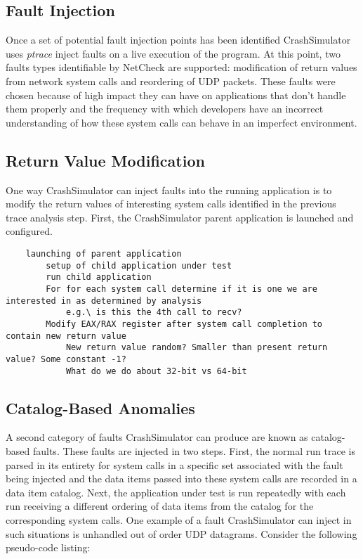     \subsection{Fault Injection}

     Once a set of potential fault injection points has been identified CrashSimulator uses
    \emph{ptrace} inject faults on a live execution of the program. At this point, two faults types identifiable by
    NetCheck are supported: modification of return values from network system calls and reordering of UDP packets.
    These faults were chosen because of high impact they can have on applications that don't handle them properly and
    the frequency with which developers have an incorrect understanding of how these system calls can behave in an
    imperfect environment.

    \subsection{Return Value Modification}

    One way CrashSimulator can inject faults into the running application is to
    modify the return values of interesting system calls identified in the previous trace analysis step. First, the
    CrashSimulator parent application is launched and configured.

    \begin{verbatim}
    launching of parent application
        setup of child application under test
        run child application
        For for each system call determine if it is one we are interested in as determined by analysis
            e.g.\ is this the 4th call to recv?
        Modify EAX/RAX register after system call completion to contain new return value
            New return value random? Smaller than present return value? Some constant -1?
            What do we do about 32-bit vs 64-bit
    \end{verbatim}

    \subsection{Catalog-Based Anomalies}

    A second category of faults CrashSimulator can produce are known as catalog-based
    faults. These faults are injected in two steps. First, the normal run trace is parsed in its entirety for system
    calls in a specific set associated with the fault being injected and the data items passed into these system calls
    are recorded in a data item catalog. Next, the application under test is run repeatedly with each run receiving a
    different ordering of data items from the catalog for the corresponding system calls. One example of a fault
    CrashSimulator can inject in such situations is unhandled out of order UDP datagrams. Consider the following
    pseudo-code listing:

